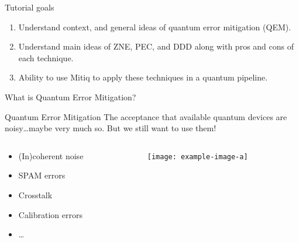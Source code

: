 \documentclass[11pt,aspectratio=1610,xcolor=dvipsnames]{beamer}
\begin{document}
\begin{frame}{Tutorial goals}
	\begin{enumerate}
		\item Understand context, and general ideas of quantum error mitigation (QEM).
		\item Understand main ideas of ZNE, PEC, and DDD along with pros and cons of each technique.
		\item Ability to use Mitiq to apply these techniques in a quantum pipeline.
	\end{enumerate}
\end{frame}

\begin{frame}{What is Quantum Error Mitigation?}
	\begin{block}{Quantum Error Mitigation}
		The acceptance that available quantum devices are noisy\ldots maybe very much so.
		But we still want to use them!
	\end{block}
	\begin{columns}
		\begin{column}{0.35\textwidth}
			\begin{itemize}
				\item (In)coherent noise
				\item SPAM errors
				\item Crosstalk
				\item Calibration errors
				\item \dots
			\end{itemize}
		\end{column}
		\begin{column}{0.6\textwidth}
			\begin{figure}[H]
				\centering
				\texttt{[image: example-image-a]}
			\end{figure}
		\end{column}
	\end{columns}
\end{frame}
\end{document}
